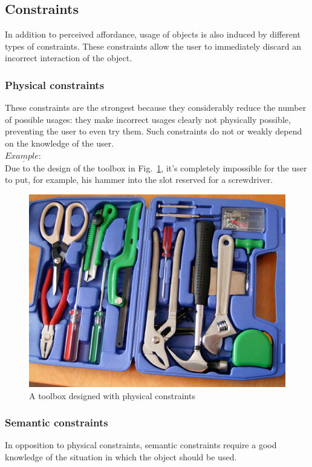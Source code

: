 \documentclass[a4paper,11pt] {article}
\theoremstyle{definition}
\begin{document}
    \subsection{Constraints}
    In addition to perceived affordance, usage of objects is also induced by different types of constraints. These constraints allow the user to immediately discard an incorrect interaction of the object.

        \subsubsection{Physical constraints}
        These constraints are the strongest because they considerably reduce the number of possible usages: they make incorrect usages clearly not physically possible, preventing the user to even try them. Such constraints do not or weakly depend on the knowledge of the user.\\

        $\underline{Example:}$\\
        Due to the design of the toolbox in Fig.~\ref{fig:phys-constr-toolbox}, it's completely impossible for the user to put, for example, his hammer into the slot reserved for a screwdriver.
        \begin{figure}[h]
        \centering
        \includegraphics[scale=0.1]{fig-report/toolbox.jpg}
        \caption{A toolbox designed with physical constraints}
        \label{fig:phys-constr-toolbox}
        \end{figure}

        \subsubsection{Semantic constraints}
       In opposition to physical constraints, semantic constraints require a good knowledge of the situation in which the object should be used.\\
\end{document}

